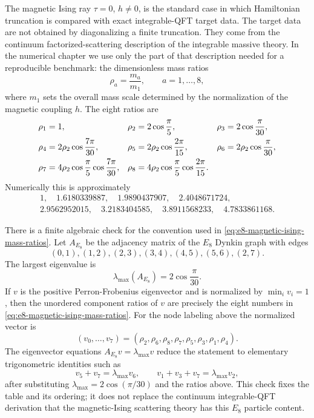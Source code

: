 The magnetic Ising ray \(\tau=0\), \(h\ne0\), is the standard case in which
Hamiltonian truncation is compared with exact integrable-QFT target data.
The target data are not obtained by diagonalizing a finite truncation.  They
come from the continuum factorized-scattering description of the integrable
massive theory.  In the numerical chapter we use only the part of that
description needed for a reproducible benchmark: the dimensionless mass
ratios
\[
  \rho_a=\frac{m_a}{m_1},\qquad a=1,\ldots,8,
\]
where \(m_1\) sets the overall mass scale determined by the normalization of
the magnetic coupling \(h\).  The eight ratios are
\begin{align}
  \rho_1 &= 1, &
  \rho_2 &= 2\cos\frac{\pi}{5}, &
  \rho_3 &= 2\cos\frac{\pi}{30}, \notag\\
  \rho_4 &= 2\rho_2\cos\frac{7\pi}{30}, &
  \rho_5 &= 2\rho_2\cos\frac{2\pi}{15}, &
  \rho_6 &= 2\rho_2\cos\frac{\pi}{30}, \notag\\
  \rho_7 &= 4\rho_2\cos\frac{\pi}{5}\cos\frac{7\pi}{30},&
  \rho_8 &= 4\rho_2\cos\frac{\pi}{5}\cos\frac{2\pi}{15}.
  \label{eq:e8-magnetic-ising-mass-ratios}
\end{align}
Numerically this is approximately
\begin{gather*}
  1,\quad
  1.6180339887,\quad
  1.9890437907,\quad
  2.4048671724,\\
  2.9562952015,\quad
  3.2183404585,\quad
  3.8911568233,\quad
  4.7833861168 .
\end{gather*}

There is a finite algebraic check for the convention used in
\eqref{eq:e8-magnetic-ising-mass-ratios}.  Let \(A_{E_8}\) be the adjacency
matrix of the \(E_8\) Dynkin graph with edges
\[
  (0,1),(1,2),(2,3),(3,4),(4,5),(5,6),(2,7).
\]
The largest eigenvalue is
\[
  \lambda_{\max}(A_{E_8})=2\cos\frac{\pi}{30}.
\]
If \(v\) is the positive Perron-Frobenius eigenvector and is normalized by
\(\min_i v_i=1\), then the unordered component ratios of \(v\) are precisely
the eight numbers in \eqref{eq:e8-magnetic-ising-mass-ratios}.  For the node
labeling above the normalized vector is
\[
  (v_0,\ldots,v_7)
  =
  (\rho_2,\rho_6,\rho_8,\rho_7,\rho_5,\rho_3,\rho_1,\rho_4).
\]
The eigenvector equations \(A_{E_8}v=\lambda_{\max}v\) reduce the statement
to elementary trigonometric identities such as
\[
  v_5+v_7=\lambda_{\max}v_6,\qquad
  v_1+v_3+v_7=\lambda_{\max}v_2,
\]
after substituting \(\lambda_{\max}=2\cos(\pi/30)\) and the ratios above.
This check fixes the table and its ordering; it does not replace the
continuum integrable-QFT derivation that the magnetic-Ising scattering theory
has this \(E_8\) particle content.

